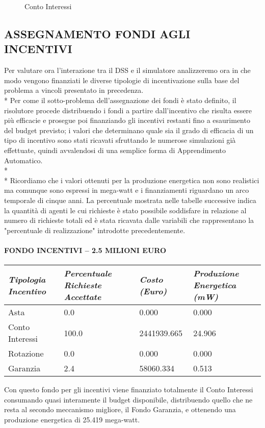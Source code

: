 \documentclass[12pt,a4paper,openright,twoside]{report}
\begin{document}
\begin{figure}[H]
	\centering
	\qquad
	\caption{Conto Interessi}
	\label{graphCIsoc}
\end{figure}


\subsection{ASSEGNAMENTO FONDI AGLI INCENTIVI}
Per valutare ora l'interazione tra il DSS e il simulatore analizzeremo ora in che modo vengono finanziati le diverse tipologie di incentivazione sulla base del problema a vincoli presentato in precedenza.\\*
Per come il sotto-problema dell'assegnazione dei fondi è stato definito, il risolutore procede distribuendo i fondi a partire dall'incentivo che risulta essere più efficacie e prosegue poi finanziando gli incentivi restanti fino a esaurimento del budget previsto; i valori che determinano quale sia il grado di efficacia di un tipo di incentivo sono stati ricavati sfruttando le numerose simulazioni già effettuate, quindi avvalendosi di una semplice forma di Apprendimento Automatico.
\\* \\*
Ricordiamo che i valori ottenuti per la produzione energetica non sono realistici ma comunque sono espressi in mega-watt e i finanziamenti riguardano un arco temporale di cinque anni. La percentuale mostrata nelle tabelle successive indica la quantità di agenti le cui richieste è stato possibile soddisfare in relazione al numero di richieste totali ed è stata ricavata dalle variabili che rappresentano la "percentuale di realizzazione" introdotte precedentemente.
\paragraph{FONDO INCENTIVI – 2.5 MILIONI EURO}
\begin{center}
	\begin{tabular}{ | p{3.5cm} | p{3.5cm} | p{3.5cm} | p{3.5cm} | }
		\hline
		\nohyphens{\emph{Tipologia Incentivo}} & \nohyphens{\emph{Percentuale Richieste Accettate}} & \nohyphens{\emph{Costo (Euro)}} & \nohyphens{\emph{Produzione Energetica (mW)}} \\ \hline
		Asta & 0.0 & 0.000 & 0.000 \\ \hline
		Conto Interessi & 100.0 & 2441939.665 & 24.906 \\ \hline
		Rotazione & 0.0 & 0.000 & 0.000 \\ \hline
		Garanzia & 2.4 & 58060.334 & 0.513 \\
		\hline
	\end{tabular}
\end{center}
Con questo fondo per gli incentivi viene finanziato totalmente il Conto Interessi consumando quasi interamente il budget disponibile, distribuendo quello che ne resta al secondo meccanismo migliore, il Fondo Garanzia, e ottenendo una produzione energetica di 25.419 mega-watt.
\end{document}
